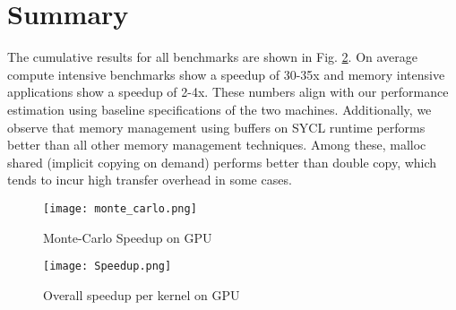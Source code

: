 \documentclass[14pt,fleqn]{article}
\begin{document}
\section{Summary}
The cumulative results for all benchmarks are shown in Fig. \ref{fig:Speedup}. On average compute intensive benchmarks show a speedup of 30-35x and memory intensive applications show a speedup of 2-4x. These numbers align with our performance estimation using baseline specifications of the two machines. Additionally, we observe that memory management using buffers on SYCL runtime performs better than all other memory management techniques. Among these, malloc shared (implicit copying on demand) performs better than double copy, which tends to incur high transfer overhead in some cases.
\begin{figure}
\centering
    \texttt{[image: monte\_carlo.png]}
    \caption{Monte-Carlo Speedup on GPU}
    \label{fig:Mandlebrot}
\end{figure}

\begin{figure}
\centering
    \texttt{[image: Speedup.png]}
    \caption{Overall speedup per kernel on GPU}
    \label{fig:Speedup}
\end{figure}




\end{document}

